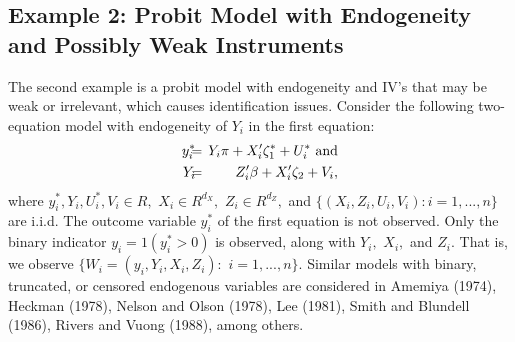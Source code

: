 \documentclass[12pt,titlepage,final,oneside,letterpaper]{article}
\begin{document}
\subsection{Example 2: Probit Model with Endogeneity and Possibly Weak Instruments} 
\label{Simul Probit Ex Sec}

\hspace{0.25in}The second example is a probit model with endogeneity and
IV's that may be weak or irrelevant, which causes identification issues.
Consider the following two-equation model with endogeneity of $Y_{i}$ in the
first equation:%
\begin{eqnarray}
y_{i}^{\ast }\hspace{-0.08in} &=&\hspace{-0.08in}Y_{i}\pi +X_{i}^{\prime
}\zeta _{1}^{\ast }+U_{i}^{\ast }\text{ and}  \notag \\
Y_{i}\hspace{-0.08in} &=&\hspace{-0.08in}Z_{i}^{\prime }\beta +X_{i}^{\prime
}\zeta _{2}+V_{i},  \label{Probit-Model}
\end{eqnarray}%
where $y_{i}^{\ast },Y_{i},U_{i}^{\ast },V_{i}\in R,$ $X_{i}\in R^{d_{X}},$ $%
Z_{i}\in R^{d_{Z}},$ and $\{(X_{i},Z_{i},U_{i},V_{i}):i=1,...,n\}$ are
i.i.d. The outcome variable $y_{i}^{\ast }$ of the first equation is not
observed. Only the binary indicator $y_{i}=1(y_{i}^{\ast }>0)$ is observed,
along with $Y_{i},$ $X_{i},$ and $Z_{i}.$ That is, we observe $%
\{W_{i}=(y_{i},Y_{i},X_{i},Z_{i}):$ $i=1,...,n\}.$ Similar models with
binary, truncated, or censored endogenous variables are considered in
Amemiya (1974), Heckman (1978), Nelson and Olson (1978), Lee (1981), Smith
and Blundell (1986), Rivers and Vuong (1988), among others.
\end{document}
